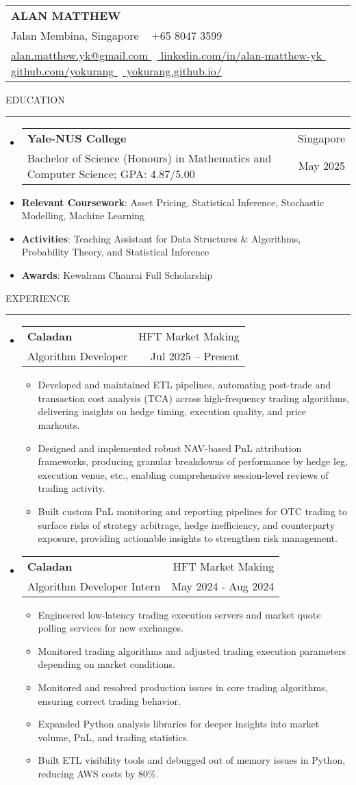 \documentclass[letterpaper, 11pt]{article}
\makeatletter
\def\sectionlineskip{\medskip}
\def\sectionskip{\medskip}
\def\namesize{\LARGE}
\newcommand{\ResumeHeader}[6]{
  \noindent
  \begin{tabularx}{\textwidth}{>{\centering\arraybackslash}X}
    \namesize\MakeUppercase{\textbf{\fullname}} \\
    #1 \textbar\ #2 \\
    #3 \textbar\ #4 \textbar\ #5 \textbar\ #6 \\
  \end{tabularx}
}
\def \fullname { Alan Matthew }
\def \linkedinlink { https://www.linkedin.com/in/alan-matthew-yk }
\def \linkedintext { linkedin.com/in/alan-matthew-yk }
\def \phonenumber { +65 8047 3599 }
\def \githublink { https://github.com/yokurang }
\def \githubtext { github.com/yokurang }
\def \emaillink { mailto:alan.matthew.yk@gmail.com }
\def \emailtext { alan.matthew.yk@gmail.com }
\def \websitelink { https://yokurang.github.io/ }
\def \websitetext { yokurang.github.io/ }
\def \address { 9 Jalan Membina, Singapore }
\def \headertype {\ResumeHeader}
\def \linkedin {\href{\linkedinlink}{\linkedintext}}
\def \phone {{\phonenumber}}
\def \email {\href{\emaillink}{\emailtext}}
\def \github {\href{\githublink}{\githubtext}}
\def \website {\href{\websitelink}{\websitetext}}
\newcommand{\SectionHeading}[1]{
  \sectionskip
  \raggedright\raggedbottom\MakeUppercase{\large{#1}}
  \sectionlineskip
  \hrule
  \color{black}
}
\newcommand{\ResumeEntryTSDL}[4]{
  \vspace{1pt}\item
    \begin{tabular*}{\textwidth}[t]{l@{\extracolsep{\fill}}r} 
      \textbf{#1} & #2 \\
      #3 & #4 \\
    \end{tabular*}\vspace{-2.835pt} %
}
\newcommand{\ResumeItem}[2]{
  \item{
    \textbf{#1}{: #2 \vspace{-2.835pt}}
  }
}
\newcommand{\ResumeItemDefault}[1]{
  \item{
    #1 \vspace{-2.835pt}
  }
}
\newcommand{\ResumeSubItem}[2]{\ResumeItem{#1}{#2}\vspace{-2.835pt}}
\newcommand{\ResumeEntryStart}{\begin{itemize}[leftmargin=0mm, label={}]}
\newcommand{\ResumeEntryEnd}{\end{itemize}\vspace{-2.835pt}} %
\newcommand{\ResumeItemListStart}{\begin{itemize}[leftmargin=5mm, label=$\bullet$, itemsep=1mm, parsep=1mm]} %
\newcommand{\ResumeItemListEnd}{\end{itemize}}
\makeatother
\begin{document}
  \headertype{\address}{\phone}{\email}{\linkedin}{\github}{\website}
  
  \SectionHeading{Education}
  \ResumeEntryStart
    \ResumeEntryTSDL{Yale-NUS College} {Singapore}
    {Bachelor of Science (Honours) in Mathematics and Computer Science; GPA: 4.87/5.00} {May 2025}
    \ResumeSubItem{Relevant Coursework}{Asset Pricing, Statistical Inference, Stochastic Modelling, Machine Learning}
    \ResumeSubItem{Activities}{Teaching Assistant for Data Structures \& Algorithms, Probability Theory, and Statistical Inference}
    \ResumeSubItem{Awards}{Kewalram Chanrai Full Scholarship}
  \ResumeEntryEnd

  \vspace{5pt}

  \SectionHeading{Experience}

  \ResumeEntryStart
  \ResumeEntryTSDL{Caladan}{HFT Market Making}{Algorithm Developer}{Jul 2025 – Present}
  \ResumeItemListStart
  \ResumeItemDefault{Developed and maintained ETL pipelines, automating post-trade and transaction cost analysis (TCA) across high-frequency trading algorithms, delivering insights on hedge timing, execution quality, and price markouts.}
  \ResumeItemDefault{Designed and implemented robust NAV-based PnL attribution frameworks, producing granular breakdowns of performance by hedge leg, execution venue, etc., enabling comprehensive session-level reviews of trading activity.}
  \ResumeItemDefault{Built custom PnL monitoring and reporting pipelines for OTC trading to surface risks of strategy arbitrage, hedge inefficiency, and counterparty exposure, providing actionable insights to strengthen risk management.}

  \ResumeItemListEnd
  \ResumeEntryEnd

  \ResumeEntryStart
  \ResumeEntryTSDL{Caladan}{HFT Market Making}{Algorithm Developer Intern}{May 2024 - Aug 2024}
  \ResumeItemListStart
  \ResumeItemDefault{Engineered low-latency trading execution servers and market quote polling services for new exchanges.}
  \ResumeItemDefault{Monitored trading algorithms and adjusted trading execution parameters depending on market conditions.}
  \ResumeItemDefault{Monitored and resolved production issues in core trading algorithms, ensuring correct trading behavior.}
  \ResumeItemDefault{Expanded Python analysis libraries for deeper insights into market volume, PnL, and trading statistics.}
  \ResumeItemDefault{Built ETL visibility tools and debugged out of memory issues in Python, reducing AWS costs by 80\%.}
  \ResumeItemListEnd
  \ResumeEntryEnd
\end{document}
